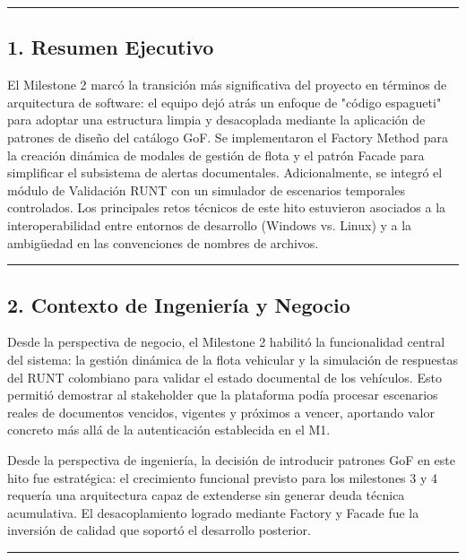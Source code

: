 \documentclass[11pt,a4paper]{article}
\begin{document}
\vspace{0.6em}\hrule\vspace{0.8em}

\subsection{1. Resumen Ejecutivo}

El Milestone 2 marcó la transición más significativa del proyecto en términos de arquitectura de software: el equipo dejó atrás un enfoque de "código espagueti" para adoptar una estructura limpia y desacoplada mediante la aplicación de patrones de diseño del catálogo GoF. Se implementaron el Factory Method para la creación dinámica de modales de gestión de flota y el patrón Facade para simplificar el subsistema de alertas documentales. Adicionalmente, se integró el módulo de Validación RUNT con un simulador de escenarios temporales controlados. Los principales retos técnicos de este hito estuvieron asociados a la interoperabilidad entre entornos de desarrollo (Windows vs. Linux) y a la ambigüedad en las convenciones de nombres de archivos.

\vspace{0.6em}\hrule\vspace{0.8em}

\subsection{2. Contexto de Ingeniería y Negocio}

Desde la perspectiva de negocio, el Milestone 2 habilitó la funcionalidad central del sistema: la gestión dinámica de la flota vehicular y la simulación de respuestas del RUNT colombiano para validar el estado documental de los vehículos. Esto permitió demostrar al stakeholder que la plataforma podía procesar escenarios reales de documentos vencidos, vigentes y próximos a vencer, aportando valor concreto más allá de la autenticación establecida en el M1.

Desde la perspectiva de ingeniería, la decisión de introducir patrones GoF en este hito fue estratégica: el crecimiento funcional previsto para los milestones 3 y 4 requería una arquitectura capaz de extenderse sin generar deuda técnica acumulativa. El desacoplamiento logrado mediante Factory y Facade fue la inversión de calidad que soportó el desarrollo posterior.

\vspace{0.6em}\hrule\vspace{0.8em}
\end{document}
